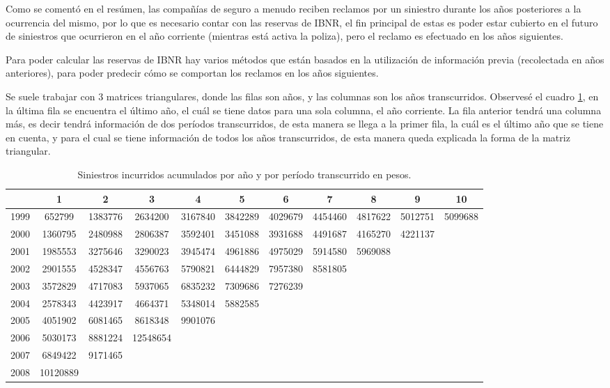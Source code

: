 \documentclass[
  12pt,
]{article}
\begin{document}
Como se comentó en el resúmen, las compañías de seguro a menudo reciben
reclamos por un siniestro durante los años posteriores a la ocurrencia
del mismo, por lo que es necesario contar con las reservas de IBNR, el
fin principal de estas es poder estar cubierto en el futuro de
siniestros que ocurrieron en el año corriente (mientras está activa la
poliza), pero el reclamo es efectuado en los años siguientes.

Para poder calcular las reservas de IBNR hay varios métodos que están
basados en la utilización de información previa (recolectada en años
anteriores), para poder predecir cómo se comportan los reclamos en los
años siguientes.

Se suele trabajar con 3 matrices triangulares, donde las filas son años,
y las columnas son los años transcurridos. Observesé el cuadro
\ref{tabla1}, en la última fila se encuentra el último año, el cuál se
tiene datos para una sola columna, el año corriente. La fila anterior
tendrá una columna más, es decir tendrá información de dos períodos
transcurridos, de esta manera se llega a la primer fila, la cuál es el
último año que se tiene en cuenta, y para el cual se tiene información
de todos los años transcurridos, de esta manera queda explicada la forma
de la matriz triangular.

\begin{table}[ht]
\centering
\caption{Siniestros incurridos acumulados por año y por período transcurrido en pesos.} 
\label{tabla1}
\begingroup\fontsize{8.5pt}{10pt}\selectfont
\begin{tabular}{ccccccccccc}
  \hline
 & 1 & 2 & 3 & 4 & 5 & 6 & 7 & 8 & 9 & 10 \\ 
  \hline
1999 & 652799 & 1383776 & 2634200 & 3167840 & 3842289 & 4029679 & 4454460 & 4817622 & 5012751 & 5099688 \\ 
  2000 & 1360795 & 2480988 & 2806387 & 3592401 & 3451088 & 3931688 & 4491687 & 4165270 & 4221137 &  \\ 
  2001 & 1985553 & 3275646 & 3290023 & 3945474 & 4961886 & 4975029 & 5914580 & 5969088 &  &  \\ 
  2002 & 2901555 & 4528347 & 4556763 & 5790821 & 6444829 & 7957380 & 8581805 &  &  &  \\ 
  2003 & 3572829 & 4717083 & 5937065 & 6835232 & 7309686 & 7276239 &  &  &  &  \\ 
  2004 & 2578343 & 4423917 & 4664371 & 5348014 & 5882585 &  &  &  &  &  \\ 
  2005 & 4051902 & 6081465 & 8618348 & 9901076 &  &  &  &  &  &  \\ 
  2006 & 5030173 & 8881224 & 12548654 &  &  &  &  &  &  &  \\ 
  2007 & 6849422 & 9171465 &  &  &  &  &  &  &  &  \\ 
  2008 & 10120889 &  &  &  &  &  &  &  &  &  \\ 
   \hline
\end{tabular}
\endgroup
\end{table}
\end{document}
